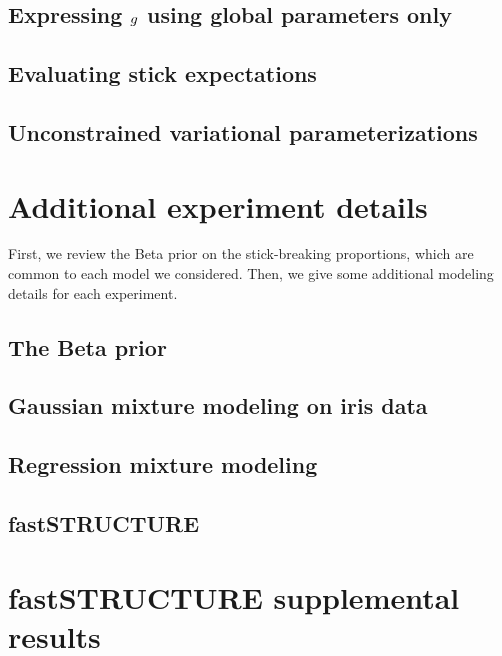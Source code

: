 \documentclass[ba]{imsart}
\begin{document}
\subsection{Expressing $g$ using global parameters only}


\subsection{Evaluating stick expectations}


\subsection{Unconstrained variational parameterizations}


\section{Additional experiment details}

First, we review the Beta prior on the stick-breaking proportions,
which are common to each model we considered.
Then, we give some additional modeling details for each experiment.

    \subsection{The Beta prior}
    

    \subsection{Gaussian mixture modeling on iris data}
    

    \subsection{Regression mixture modeling}
    

    \subsection{fastSTRUCTURE}
    


\section{fastSTRUCTURE supplemental results}

\end{document}

